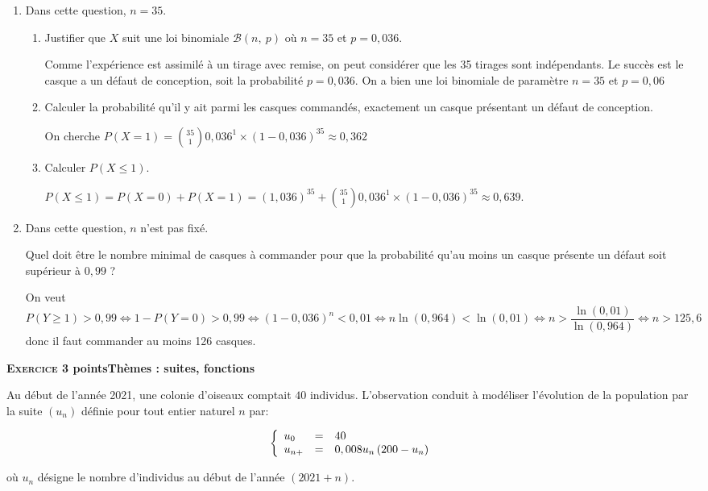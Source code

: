 \documentclass[11pt]{article}
\begin{document}
\begin{enumerate}
\item Dans cette question, $n = 35$.
	\begin{enumerate}
		\item Justifier que $X$ suit une loi binomiale $\mathcal{B}(n,~p)$ où $n = 35$ et $p = 0,036$.
		
		Comme l'expérience est assimilé à un tirage avec remise, on peut considérer que les 35 tirages sont indépendants. Le succès est le casque a un défaut de conception, soit la probabilité $p = 0,036$. On a bien une loi binomiale de paramètre $n=35$ et $p=0,06$
		\item Calculer la probabilité qu'il y ait parmi les casques commandés, exactement un casque présentant un défaut de conception.
		
On cherche $P(X = 1)=\binom{35}{1}0,036^1\times (1 - 0,036)^{35}\approx 0,362$
		\item Calculer $P(X \leqslant 1)$.
		
$P(X \leqslant 1)= P(X = 0) + P(X = 1) = (1,036)^{35}+\binom{35}{1}0,036^1\times (1-0,036)^{35} \approx 0,639$.
	\end{enumerate}	
\item Dans cette question, $n$ n'est pas fixé.

Quel doit être le nombre minimal de casques à commander pour que la probabilité 
 qu'au moins un casque présente un défaut soit supérieur à $0,99$ ?
 
 On veut $P(Y\geq 1)> 0,99 \iff  1-P(Y=0) >0,99 \iff (1-0,036)^n<0,01 \iff n\ln(0,964)<\ln(0,01) \iff  n > \dfrac{\ln(0,01)}{\ln(0,964)} \iff  n >125,6$ donc il faut commander au moins 126 casques.
\end{enumerate}

\bigskip

\textbf{\textsc{Exercice 3}  points\hfill Thèmes : suites, fonctions}

\medskip

Au début de l'année 2021, une colonie d'oiseaux comptait $40$ individus. L'observation conduit à modéliser l'évolution de la population par la suite $\left(u_n\right)$ définie pour tout entier naturel $n$ par:

\[\left\{\begin{array}{l c l}
u_0&=&40\\u_{n+}&=&0,008u_n\left(200 - u_n\right)
\end{array}\right.\]

où $u_n$ désigne le nombre d'individus au début de l'année $(2021+n)$.
\end{document}
